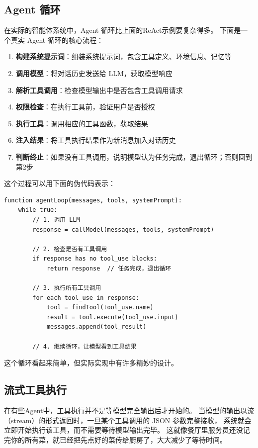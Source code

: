 \subsection{Agent 循环}
在实际的智能体系统中，Agent 循环比上面的ReAct示例要复杂得多。
下面是一个真实 Agent 循环的核心流程：

\begin{enumerate}
	\item \textbf{构建系统提示词}：组装系统提示词，包含工具定义、环境信息、记忆等
	\item \textbf{调用模型}：将对话历史发送给 LLM，获取模型响应
	\item \textbf{解析工具调用}：检查模型输出中是否包含工具调用请求
	\item \textbf{权限检查}：在执行工具前，验证用户是否授权
	\item \textbf{执行工具}：调用相应的工具函数，获取结果
	\item \textbf{注入结果}：将工具执行结果作为新消息加入对话历史
	\item \textbf{判断终止}：如果没有工具调用，说明模型认为任务完成，退出循环；否则回到第2步
\end{enumerate}

这个过程可以用下面的伪代码表示：

\begin{verbatim}
function agentLoop(messages, tools, systemPrompt):
    while true:
        // 1. 调用 LLM
        response = callModel(messages, tools, systemPrompt)

        // 2. 检查是否有工具调用
        if response has no tool_use blocks:
            return response  // 任务完成，退出循环

        // 3. 执行所有工具调用
        for each tool_use in response:
            tool = findTool(tool_use.name)
            result = tool.execute(tool_use.input)
            messages.append(tool_result)

        // 4. 继续循环，让模型看到工具结果
\end{verbatim}

这个循环看起来简单，但实际实现中有许多精妙的设计。

\subsection{流式工具执行}
在有些Agent中，工具执行并不是等模型完全输出后才开始的。
当模型的输出以流（stream）的形式返回时，一旦某个工具调用的 JSON 参数完整接收，
系统就会立即开始执行该工具，而不需要等待模型输出完毕。
这就像餐厅里服务员还没记完你的所有菜，就已经把先点好的菜传给厨房了，大大减少了等待时间。

